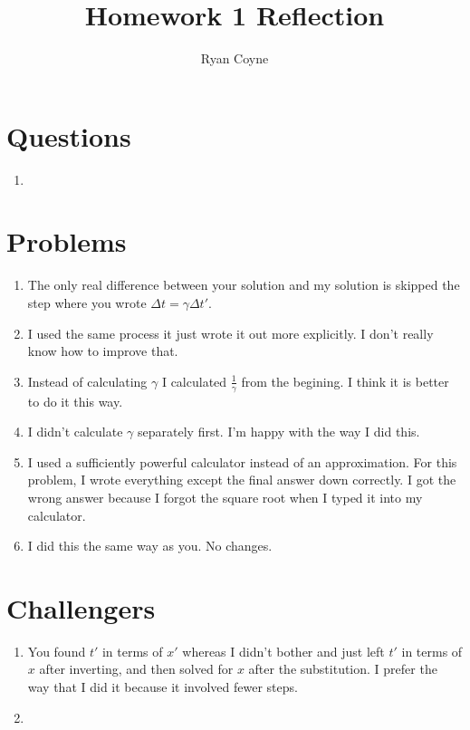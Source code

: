 \documentclass[12pt]{article}
\begin{document}
    \title{Homework 1 Reflection}
    \author{Ryan Coyne}
    \maketitle
    
    \section{Questions}
    \begin{enumerate}
        \item 
    \end{enumerate}

    \section{Problems}
    \begin{enumerate}
        \item  The only real difference between your solution and my solution is skipped the step where you wrote \(\Delta t = \gamma\Delta t'\). 
        \item I used the same process it just wrote it out more explicitly. I don't really know how to improve that.
        \item Instead of calculating \(\gamma\) I calculated \(\frac{1}{\gamma}\) from the begining. I think it is better to do it this way.
        \item I didn't calculate \(\gamma\) separately first. I'm happy with the way I did this.
        \item I used a sufficiently powerful calculator instead of an approximation. For this problem, I wrote everything except the final answer down correctly. I got the wrong answer because I forgot the square root when I typed it into my calculator. 
        \item I did this the same way as you. No changes.
    \end{enumerate}

    \section{Challengers}
    \begin{enumerate}
        \item You found \(t'\) in terms of \(x'\) whereas I didn't bother and just left \(t'\) in terms of \(x\) after inverting, and then solved for \(x\) after the substitution. I prefer the way that I did it because it involved fewer steps.
        \item 
    \end{enumerate}
\end{document}
